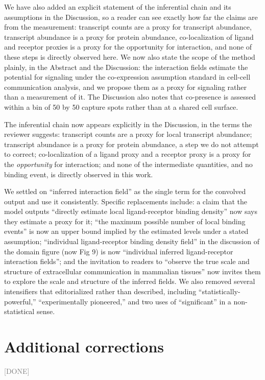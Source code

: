 \documentclass[11pt]{article}
\newcommand{\status}[1]{\textcolor{gray}{\small\textsf{[#1]}}}
\begin{document}
We have also added an explicit statement of the inferential chain and its assumptions in the
Discussion, so a reader can see exactly how far the claims are from the measurement:
transcript counts are a proxy for transcript abundance, transcript abundance is a proxy for
protein abundance, co-localization of ligand and receptor proxies is a proxy for the
opportunity for interaction, and none of these steps is directly observed here.
We now also state the scope of the method plainly, in the Abstract and the Discussion: the
interaction fields estimate the potential for signaling under the co-expression assumption
standard in cell-cell communication analysis, and we propose them as a proxy for signaling
rather than a measurement of it. The Discussion also notes that co-presence is assessed
within a bin of 50 by 50 capture spots rather than at a shared cell surface.

The inferential chain now appears explicitly in the Discussion, in the terms the reviewer
suggests: transcript counts are a proxy for local transcript abundance; transcript abundance
is a proxy for protein abundance, a step we do not attempt to correct; co-localization of a
ligand proxy and a receptor proxy is a proxy for the \emph{opportunity} for interaction; and
none of the intermediate quantities, and no binding event, is directly observed in this
work.

We settled on ``inferred interaction field'' as the single term for the convolved output and
use it consistently. Specific replacements include: a claim that the model outputs
``directly estimate local ligand-receptor binding density'' now says they estimate a proxy
for it; ``the maximum possible number of local binding events'' is now an upper bound
implied by the estimated levels under a stated assumption; ``individual ligand-receptor
binding density field'' in the discussion of the domain figure (now Fig 9) is now ``individual inferred
ligand-receptor interaction fields''; and the invitation to readers to ``observe the true
scale and structure of extracellular communication in mammalian tissues'' now invites them
to explore the scale and structure of the inferred fields. We also removed several
intensifiers that editorialized rather than described, including ``statistically-powerful,''
``experimentally pioneered,'' and two uses of ``significant'' in a non-statistical sense.

\section{Additional corrections} \status{DONE}
\end{document}

